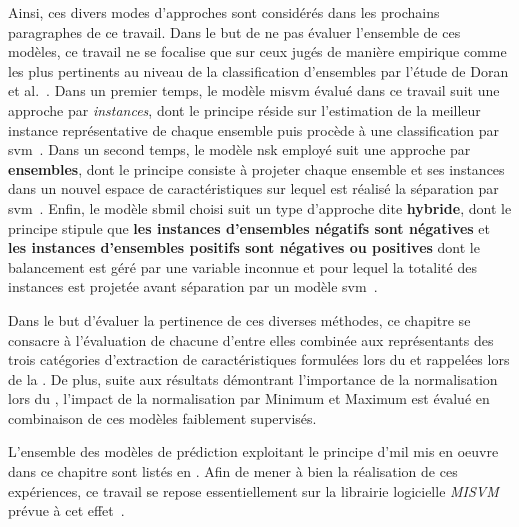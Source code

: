 Ainsi, ces divers modes d'approches sont considérés dans les prochains paragraphes de ce travail. Dans le but de ne pas évaluer l'ensemble de ces modèles, ce travail ne se focalise que sur ceux jugés de manière empirique comme les plus pertinents au niveau de la classification d'ensembles par l'étude de Doran et al.~\cite{Doran2014}. Dans un premier temps, le modèle \gls{misvm} évalué dans ce travail suit une approche par \textit{instances}, dont le principe réside sur l'estimation de la meilleur instance représentative de chaque ensemble puis procède à une classification par \gls{svm}~\cite{Andrews2003}. Dans un second temps, le modèle \gls{nsk} employé suit une approche par \textbf{ensembles}, dont le principe consiste à projeter chaque ensemble et ses instances dans un nouvel espace de caractéristiques sur lequel est réalisé la séparation par \gls{svm}~\cite{Gartner2002}. Enfin, le modèle \gls{sbmil} choisi suit un type d'approche dite \textbf{hybride}, dont le principe stipule que \textbf{les instances d'ensembles négatifs sont négatives} et \textbf{les instances d'ensembles positifs sont négatives ou positives} dont le balancement est géré par une variable inconnue et pour lequel la totalité des instances est projetée avant séparation par un modèle \gls{svm}~\cite{Bunescu2007}.\par

Dans le but d'évaluer la pertinence de ces diverses méthodes, ce chapitre se consacre à l'évaluation de chacune d'entre elles combinée aux représentants des trois catégories d'extraction de caractéristiques formulées lors du  et rappelées lors de la . De plus, suite aux résultats démontrant l'importance de la normalisation lors du , l'impact de la normalisation par Minimum et Maximum est évalué en combinaison de ces modèles faiblement supervisés.\par

L'ensemble des modèles de prédiction exploitant le principe d'\gls{mil} mis en oeuvre dans ce chapitre sont listés en . Afin de mener à bien la réalisation de ces expériences, ce travail se repose essentiellement sur la librairie logicielle \textit{MISVM} prévue à cet effet~\cite{Doran2014}.\par

